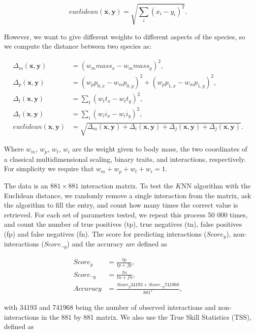 \documentclass[letterpaper]{article}
\begin{document}
\begin{equation}
  euclidean(\mathbf{x}, \mathbf{y}) = \sqrt{\sum_i (x_i - y_i)^2}.
\end{equation}

However, we want to give different weights to different aspects of the species,
so we compute the distance between two species as:

\begin{align}
  \Delta_m(\mathbf{x}, \mathbf{y}) &= (w_mmass_x - w_mmass_y)^2,\\
  \Delta_p(\mathbf{x}, \mathbf{y}) &= (w_pp_{0,x} - w_mp_{0,y})^2 + (w_pp_{1,x} - w_mp_{1,y})^2,\\
  \Delta_t(\mathbf{x}, \mathbf{y}) &= \sum_t (w_tt_x - w_tt_y)^2,\\
  \Delta_i(\mathbf{x}, \mathbf{y}) &= \sum_i (w_ii_x - w_ii_y)^2,\\
  euclidean(\mathbf{x}, \mathbf{y}) &= \sqrt{\Delta_m(\mathbf{x}, \mathbf{y}) + \Delta_i(\mathbf{x}, \mathbf{y}) + \Delta_j(\mathbf{x}, \mathbf{y}) + \Delta_j(\mathbf{x}, \mathbf{y})}.
\end{align}

Where $w_m$, $w_p$, $w_t$, $w_i$ are the weight given to body mass, the two
coordinates of a classical multidimensional scaling, binary traits, and
interactions, respectively. For simplicity we require that $w_m + w_p + w_t +
w_i = 1$.

The data is an $881 \times 881$ interaction matrix. To test the $K$NN
algorithm with the Euclidean distance, we randomly remove a single interaction
from the matrix, ask the algorithm to fill the entry, and count how many times
the correct value is retrieved. For each set of parameters tested, we repeat
this process 50 000 times, and count the number of true positives (tp), true
negatives (tn), false positives (fp) and false negatives (fn). The score for
predicting interactions ($Score_y$), non-interactions ($Score_{\neg y}$) and
the accuracy are defined as

\begin{align}
  Score_y &= \frac{tp}{tp + fp},\\
  Score_{\neg y} &= \frac{tn}{tn + fn},\\
  Accuracy &= \frac{Score_y34193 + Score_{\neg y}741968}{881^2},
\end{align}

with 34193 and 741968 being the number of observed interactions and
non-interactions in the 881 by 881 matrix. We also use the True Skill
Statistics (TSS), defined as
\end{document}
